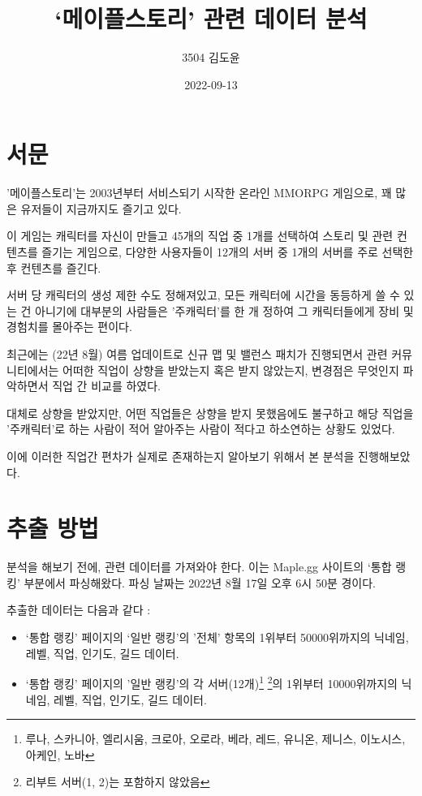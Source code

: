 \documentclass[
]{article}
\title{`메이플스토리' 관련 데이터 분석}
\author{3504 김도윤}
\date{2022-09-13}
\begin{document}
\maketitle

\hypertarget{uxc11cuxbb38}{%
\section{서문}\label{uxc11cuxbb38}}

'메이플스토리'는 2003년부터 서비스되기 시작한 온라인 MMORPG 게임으로, 꽤
많은 유저들이 지금까지도 즐기고 있다.

이 게임는 캐릭터를 자신이 만들고 45개의 직업 중 1개를 선택하여 스토리 및
관련 컨텐츠를 즐기는 게임으로, 다양한 사용자들이 12개의 서버 중 1개의
서버를 주로 선택한 후 컨텐츠를 즐긴다.

서버 당 캐릭터의 생성 제한 수도 정해져있고, 모든 캐릭터에 시간을
동등하게 쓸 수 있는 건 아니기에 대부분의 사람들은 '주캐릭터'를 한 개
정하여 그 캐릭터들에게 장비 및 경험치를 몰아주는 편이다.

최근에는 (22년 8월) 여름 업데이트로 신규 맵 및 밸런스 패치가 진행되면서
관련 커뮤니티에서는 어떠한 직업이 상향을 받았는지 혹은 받지 않았는지,
변경점은 무엇인지 파악하면서 직업 간 비교를 하였다.

대체로 상향을 받았지만, 어떤 직업들은 상향을 받지 못했음에도 불구하고
해당 직업을 '주캐릭터'로 하는 사람이 적어 알아주는 사람이 적다고
하소연하는 상황도 있었다.

이에 이러한 직업간 편차가 실제로 존재하는지 알아보기 위해서 본 분석을
진행해보았다.

\hypertarget{uxcd94uxcd9c-uxbc29uxbc95}{%
\section{추출 방법}\label{uxcd94uxcd9c-uxbc29uxbc95}}

분석을 해보기 전에, 관련 데이터를 가져와야 한다. 이는 Maple.gg 사이트의
`통합 랭킹' 부분에서 파싱해왔다. 파싱 날짜는 2022년 8월 17일 오후 6시
50분 경이다.

추출한 데이터는 다음과 같다 :

\begin{itemize}
\item
  `통합 랭킹' 페이지의 `일반 랭킹'의 '전체' 항목의 1위부터 50000위까지의
  닉네임, 레벨, 직업, 인기도, 길드 데이터.
\item
  `통합 랭킹' 페이지의 '일반 랭킹'의 각 서버(12개)\footnote{루나,
    스카니아, 엘리시움, 크로아, 오로라, 베라, 레드, 유니온, 제니스,
    이노시스, 아케인, 노바} \footnote{리부트 서버(1, 2)는 포함하지
    않았음}의 1위부터 10000위까지의 닉네임, 레벨, 직업, 인기도, 길드
  데이터.
\end{itemize}
\end{document}

